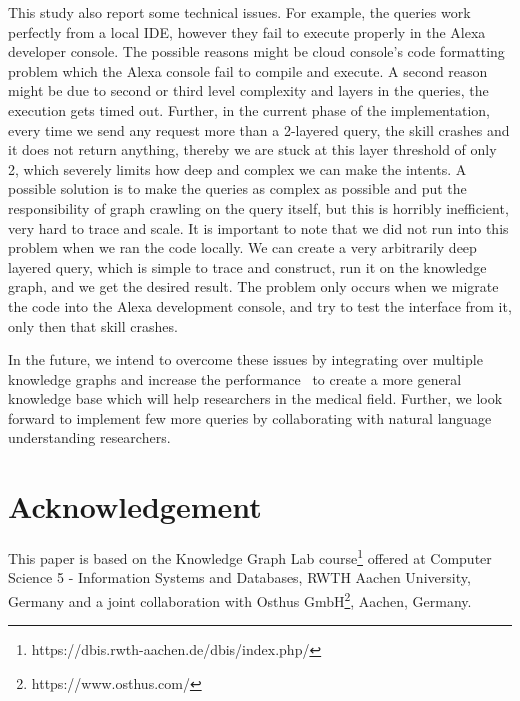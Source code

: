 \documentclass[10pt,journal,compsoc]{IEEEtran}
\begin{document}
This study also report some technical issues. For example, the queries work perfectly from a local IDE, however they fail to execute properly in the Alexa developer console. The possible reasons might be cloud console's code formatting problem which the Alexa console fail to compile and execute. A second reason might be due to second or third level complexity and layers in the queries, the execution gets timed out. Further, in the current phase of the implementation, every time we send any request more than a 2-layered query, the skill crashes and it does not return anything, thereby we are stuck at this layer threshold of only 2, which severely limits how deep and complex we can make the intents. A possible solution is to make the queries as complex as possible and put the responsibility of graph crawling on the query itself, but this is horribly inefficient, very hard to trace and scale. It is important to note that we did not run into this problem when we ran the code locally. We can create a very arbitrarily deep layered query, which is simple to trace and construct, run it on the knowledge graph, and we get the desired result. The problem only occurs when we migrate the code into the Alexa development console, and try to test the interface from it, only then that skill crashes.
   
In the future, we intend to overcome these issues by integrating over multiple knowledge graphs and increase the performance~\cite{10.1145/3366423.3380289} to create a more general knowledge base which will help researchers in the medical field. Further, we look forward to implement few more queries by collaborating with natural language understanding researchers. %

\section*{Acknowledgement}
This paper is based on the Knowledge Graph Lab course\footnote{https://dbis.rwth-aachen.de/dbis/index.php/} offered at Computer Science 5 - Information Systems and Databases, RWTH Aachen University, Germany and a joint collaboration with Osthus GmbH\footnote{https://www.osthus.com/}, Aachen, Germany. 



\end{document}
